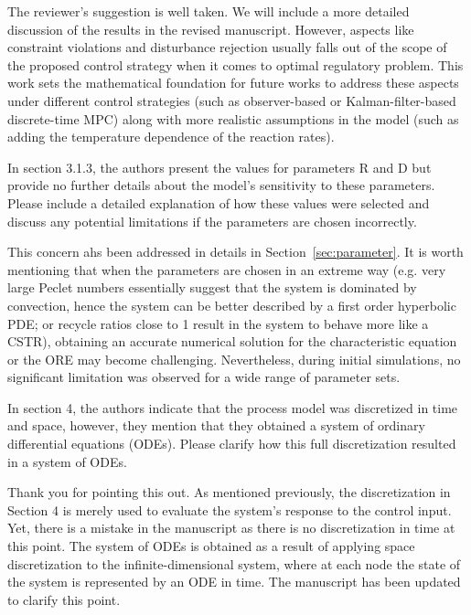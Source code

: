 \documentclass[12pt,answers]{exam}
\begin{document}
\begin{questions}
    \begin{solutionorbox}
        The reviewer's suggestion is well taken. We will include a more detailed discussion of the results in the revised manuscript. However, aspects like constraint violations and disturbance rejection usually falls out of the scope of the proposed control strategy when it comes to optimal regulatory problem. This work sets the mathematical foundation for future works to address these aspects under different control strategies (such as observer-based or Kalman-filter-based discrete-time MPC) along with more realistic assumptions in the model (such as adding the temperature dependence of the reaction rates).
    \end{solutionorbox}


    \question In section 3.1.3, the authors present the values for parameters R and D but provide no further details about the model's sensitivity to these parameters. Please include a detailed explanation of how these values were selected and discuss any potential limitations if the parameters are chosen incorrectly.

    \begin{solutionorbox}
        This concern ahs been addressed in details in Section~\ref{sec:parameter}. It is worth mentioning that when the parameters are chosen in an extreme way (e.g. very large Peclet numbers essentially suggest that the system is dominated by convection, hence the system can be better described by a first order hyperbolic PDE; or recycle ratios close to 1 result in the system to behave more like a CSTR), obtaining an accurate numerical solution for the characteristic equation or the ORE may become challenging. Nevertheless, 
        during initial simulations, no significant limitation was observed for a wide range of parameter sets.
    \end{solutionorbox}


    \question In section 4, the authors indicate that the process model was discretized in time and space, however, they mention that they obtained a system of ordinary differential equations (ODEs). Please clarify how this full discretization resulted in a system of ODEs.

    \begin{solutionorbox}
        Thank you for pointing this out. As mentioned previously, the discretization in Section 4 is merely used to evaluate the system's response to the control input. Yet, there is a mistake in the manuscript as there is no discretization in time at this point. The system of ODEs is obtained as a result of applying space discretization to the infinite-dimensional system, where at each node the state of the system is represented by an ODE in time. The manuscript has been updated to clarify this point.
    \end{solutionorbox}



\end{questions}
\end{document}
